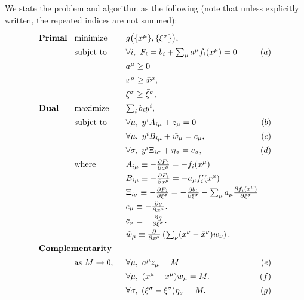 \documentclass[11pt]{article}
\renewcommand{\(}{\left(}
\renewcommand{\)}{\right)}
\renewcommand{\[}{\left[}
\renewcommand{\]}{\right]}
\newcommand{\<}{\left\langle}
\renewcommand{\>}{\right\rangle}
\begin{document}
We state the problem and algorithm as the following (note that unless explicitly written, the repeated indices are not summed): 
\begin{equation}
\label{eq:primal-dual-nonlinear}
\arraycolsep=1pt\def\arraystretch{1.4}
\begin{array}{lllr}
\text{\bf Primal}~~ & \text{minimize}\quad& g\big(\{x^\mu\}, \{\xi^\sigma\}\big), & \\
& \text{subjet to} & \forall i,~ F_i = b_i + \sum_\mu a^\mu f_i(x^\mu) = 0 & (a)  \\
& & a^\mu \geq 0 & \\
& & x^\mu \geq \bar x^\mu, & \\
& & \xi^\sigma \geq \bar \xi^\sigma, & \\
\text{\bf Dual}~~ & \text{maximize}\quad & \sum_i b_i y^i, & \\
& \text{subjet to} & \forall \mu,~ y^i A_{i\mu} + z_\mu = 0 & (b) \\
& & \forall \mu,~y^i B_{i\mu} + \tilde w_\mu = c_\mu, & (c) \\
& & \forall \sigma,~y^i \Xi_{i\sigma} + \eta_\sigma = c_\sigma, & (d) \\
& \text{where} & A_{i\mu} \equiv - \frac{\partial F_i}{\partial a^\mu} = -f_i(x^\mu) & \\
& & B_{i\mu} \equiv - \frac{\partial F_i}{\partial x^\mu} = -a_\mu f_i'(x^\mu) & \\
& & \Xi_{i\sigma} \equiv - \frac{\partial F_i}{\partial \xi^\sigma} = -  \frac{\partial b_i}{\partial \xi^\sigma} - \sum_\mu a_\mu \frac{\partial f_i(x^\mu)}{\partial \xi^\sigma} & \\
& & c_{\mu} \equiv - \frac{\partial g}{\partial x^\mu}. & \\
& & c_{\sigma} \equiv - \frac{\partial g}{\partial \xi^\sigma}. & \\
& & \tilde w_\mu \equiv \frac{\partial }{\partial x^\mu}\left(
\sum_\nu (x^\nu - \bar x^\nu) w_\nu
\right). & \\
\multicolumn{4}{l}{\text{\bf Complementarity}} \\
 & \text{as }M\rightarrow 0, \quad~ & \forall \mu,~ a^\mu z_\mu = M & (e) \\
& & \forall \mu,~ (x^\mu - \bar x^\mu) w_\mu = M . & (f) \\
& & \forall \sigma,~ (\xi^\sigma - \bar \xi^\sigma) \eta_\sigma = M . & (g)
\end{array}
\end{equation}
\end{document}
